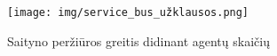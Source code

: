 \begin{figure}[ht]
\hspace{-1cm}
\centering
\texttt{[image: img/service\_bus\_užklausos.png]}
\caption{Saityno peržiūros greitis didinant agentų skaičių}
\label{fig:sb_užklausos}
\end{figure}